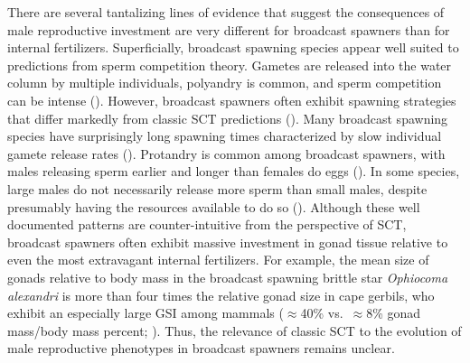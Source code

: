 \documentclass{article}
\begin{document}
There are several tantalizing lines of evidence that suggest the consequences of male reproductive investment are very different for broadcast spawners than for internal fertilizers. Superficially, broadcast spawning species appear well suited to predictions from sperm competition theory. Gametes are released into the water column by multiple individuals, polyandry is common, and sperm competition can be intense (\citealt{McEuan1988,Levitan1998,Levitan2002, Levitan2004, Marshall2002}). However, broadcast spawners often exhibit spawning strategies that differ markedly from classic SCT predictions (\citealt{BodeMarshall2007, Olito2015, Olito2017}). Many broadcast spawning species have surprisingly long spawning times characterized by slow individual gamete release rates (\citealt{McEuan1988,MarshallBolton2007}). Protandry is common among broadcast spawners, with males releasing sperm earlier and longer than females do eggs (\citealt{McEuan1988, LotterhosLevitan2011, Levitan2005, MarshallBolton2007}). In some species, large males do not necessarily release more sperm than small males, despite presumably having the resources available to do so (\citealt{Levitan1991,Styan2003}). Although these well documented patterns are counter-intuitive from the perspective of SCT, broadcast spawners often exhibit massive investment in gonad tissue relative to even the most extravagant internal fertilizers. For example, the mean size of gonads relative to body mass in the broadcast spawning brittle star \textit{Ophiocoma alexandri} is more than four times the relative gonad size in cape gerbils, who exhibit an especially large GSI among mammals ($\approx$40\% vs.~$\approx$8\% gonad mass/body mass percent; \citealt{Kenagy1986,BenitezVillalobos2012}). Thus, the relevance of classic SCT to the evolution of male reproductive phenotypes in broadcast spawners remains unclear.
\end{document}
